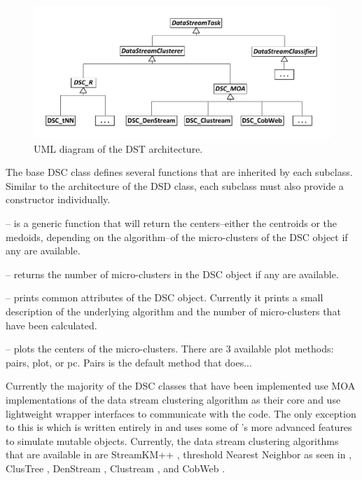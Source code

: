 \documentclass[nojss]{jss}
\begin{document}
\begin{figure}
\centering
\includegraphics{dst_uml}
\caption{UML diagram of the DST architecture.}
\label{figure:dst}
\end{figure}

The base DSC class defines several functions that are inherited by each subclass. Similar to the architecture of the DSD class, each subclass must also provide a constructor individually.


%
 – is a generic function that will return the centers--either the centroids or the medoids, depending on the algorithm--of the micro-clusters of the DSC object if any are available.


%
 – returns the number of micro-clusters in the DSC object if any are available.


%
 – prints common attributes of the DSC object. Currently it prints a small description of the underlying algorithm and the number of micro-clusters that have been calculated.


%
 – plots the centers of the micro-clusters. There are 3 available plot methods: pairs, plot, or pc. Pairs is the default method that does...

Currently the majority of the DSC classes that have been implemented use MOA implementations of the data stream clustering algorithm as their core and use lightweight  wrapper interfaces to communicate with the  code. The only exception to this is  which is written entirely in  and uses some of ’s more advanced features to simulate mutable objects. Currently, the data stream clustering algorithms that are available in  are StreamKM++ \citep{stream:Ackermann+Lammersen+Maertens+Raupach:2010}, threshold Nearest Neighbor as seen in \citep{stream:Hahsler+Dunham:2010, stream:Hahsler+Dunham:2010b}, ClusTree \citep{stream:Kranen+Assent+Baldauf+Seidl:2009}, DenStream \citep{stream:Cao+Ester+Qian+Zhou:2006}, Clustream \citep{stream:Aggarwal+Han+Wang+Yu:2003}, and CobWeb \citep{stream:Fisher:1987}.
\end{document}
